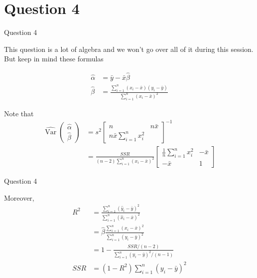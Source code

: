 \section{Question 4}

\begin{frame}{Question 4}

    This question is a lot of algebra and we won't go over all of it during this session. But keep in mind these formulas

    \begin{align*}
        \hat{\alpha} &= \bar{y} - \bar{x} \hat{\beta}
        \\
        \hat{\beta} &= \frac{\sum_{i=1}^n (x_i - \bar{x}) (y_i - \bar{y}) }{\sum_{i=1}^n (x_i - \bar{x})^2}
    \end{align*}

    Note that
    \begin{align*}
        \widehat{\operatorname{Var}} \begin{pmatrix} \hat{\alpha} \\ \hat{\beta} \end{pmatrix} &= s^2 \begin{bmatrix} n & n \bar{x} \\ n \bar{x} \sum_{i=1}^n x_i^2 \end{bmatrix}^{-1}
        \\
        &= \frac{SSR}{(n-2) \sum_{i=1}^n (x_i - \bar{x})^2} \begin{bmatrix} \frac{1}{n} \sum_{i=1}^n x_i^2 & - \bar{x} \\ - \bar{x} & 1 \end{bmatrix}
    \end{align*}
    
\end{frame}

\begin{frame}{Question 4}

    Moreover,
    \begin{align*}
        R^2 &= \frac{\sum_{i=1}^n (\hat{y}_i - \bar{y})^2}{\sum_{i=1}^n (\hat{x}_i - \bar{x})^2}
        \\
        &= \hat{\beta} \frac{\sum_{i=1}^n (x_i - \bar{x})^2}{\sum_{i=1}^n (y_i - \bar{y})^2}
        \\
        &= 1 - \frac{SSR/(n-2)}{\sum_{i=1}^n (y_i - \bar{y})^2 / (n-1)}
        \\
        SSR &= (1 - R^2) \sum_{i=1}^n (y_i - \bar{y})^2
    \end{align*}
    
\end{frame}

